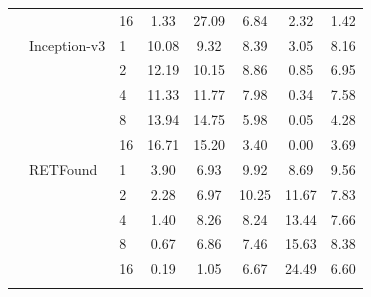 \begin{longtable}{@{}lllccccc@{}}
 &  & 16 & 1.33 & 27.09 & 6.84 & 2.32 & 1.42 \\
\addlinespace[1pt]
 & Inception-v3 & 1 & 10.08 & 9.32 & 8.39 & 3.05 & 8.16 \\
 &  & 2 & 12.19 & 10.15 & 8.86 & 0.85 & 6.95 \\
 &  & 4 & 11.33 & 11.77 & 7.98 & 0.34 & 7.58 \\
 &  & 8 & 13.94 & 14.75 & 5.98 & 0.05 & 4.28 \\
 &  & 16 & 16.71 & 15.20 & 3.40 & 0.00 & 3.69 \\
\addlinespace[1pt]
 & RETFound & 1 & 3.90 & 6.93 & 9.92 & 8.69 & 9.56 \\
 &  & 2 & 2.28 & 6.97 & 10.25 & 11.67 & 7.83 \\
 &  & 4 & 1.40 & 8.26 & 8.24 & 13.44 & 7.66 \\
 &  & 8 & 0.67 & 6.86 & 7.46 & 15.63 & 8.38 \\
 &  & 16 & 0.19 & 1.05 & 6.67 & 24.49 & 6.60 \\
\addlinespace[1pt]
\end{longtable}
